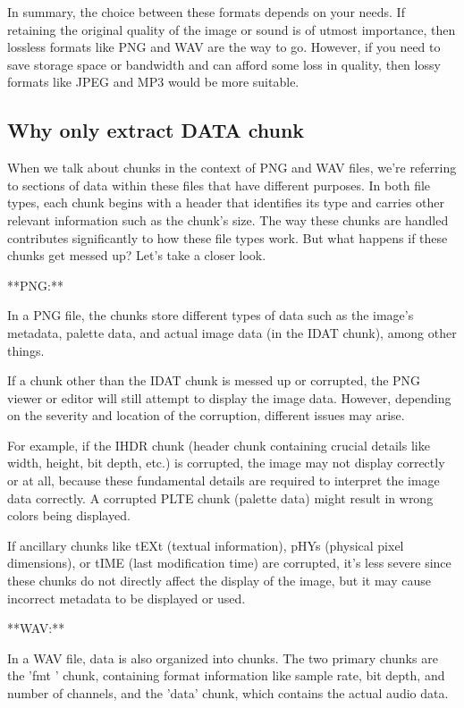 \documentclass{article}
\begin{document}
In summary, the choice between these formats depends on your needs. If retaining the original quality of the image or sound is of utmost importance, then lossless formats like PNG and WAV are the way to go. However, if you need to save storage space or bandwidth and can afford some loss in quality, then lossy formats like JPEG and MP3 would be more suitable.



\subsection{Why only extract DATA chunk}
When we talk about chunks in the context of PNG and WAV files, we're referring to sections of data within these files that have different purposes. In both file types, each chunk begins with a header that identifies its type and carries other relevant information such as the chunk's size. The way these chunks are handled contributes significantly to how these file types work. But what happens if these chunks get messed up? Let's take a closer look.

**PNG:**

In a PNG file, the chunks store different types of data such as the image's metadata, palette data, and actual image data (in the IDAT chunk), among other things. 

If a chunk other than the IDAT chunk is messed up or corrupted, the PNG viewer or editor will still attempt to display the image data. However, depending on the severity and location of the corruption, different issues may arise. 

For example, if the IHDR chunk (header chunk containing crucial details like width, height, bit depth, etc.) is corrupted, the image may not display correctly or at all, because these fundamental details are required to interpret the image data correctly. A corrupted PLTE chunk (palette data) might result in wrong colors being displayed. 

If ancillary chunks like tEXt (textual information), pHYs (physical pixel dimensions), or tIME (last modification time) are corrupted, it's less severe since these chunks do not directly affect the display of the image, but it may cause incorrect metadata to be displayed or used.

**WAV:**

In a WAV file, data is also organized into chunks. The two primary chunks are the 'fmt ' chunk, containing format information like sample rate, bit depth, and number of channels, and the 'data' chunk, which contains the actual audio data.
\end{document}
